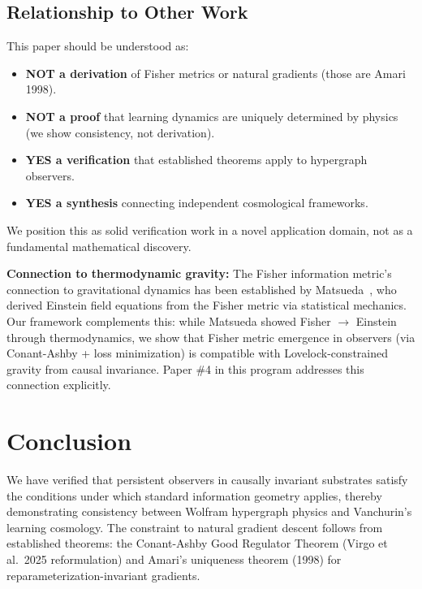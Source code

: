 \documentclass[11pt,a4paper]{article}
\theoremstyle{plain}
\theoremstyle{definition}
\theoremstyle{remark}
\begin{document}
\subsection{Relationship to Other Work}

This paper should be understood as:
\begin{itemize}[noitemsep]
\item \textbf{NOT a derivation} of Fisher metrics or natural gradients (those are Amari 1998).
\item \textbf{NOT a proof} that learning dynamics are uniquely determined by physics (we show consistency, not derivation).
\item \textbf{YES a verification} that established theorems apply to hypergraph observers.
\item \textbf{YES a synthesis} connecting independent cosmological frameworks.
\end{itemize}

We position this as solid verification work in a novel application domain, not as a fundamental mathematical discovery.

\textbf{Connection to thermodynamic gravity:} The Fisher information metric's connection to gravitational dynamics has been established by Matsueda~\cite{matsueda2013emergent}, who derived Einstein field equations from the Fisher metric via statistical mechanics. Our framework complements this: while Matsueda showed Fisher $\to$ Einstein through thermodynamics, we show that Fisher metric emergence in observers (via Conant-Ashby + loss minimization) is compatible with Lovelock-constrained gravity from causal invariance. Paper \#4 in this program addresses this connection explicitly.


\section{Conclusion}
\label{sec:conclusion}

We have verified that persistent observers in causally invariant substrates satisfy the conditions under which standard information geometry applies, thereby demonstrating consistency between Wolfram hypergraph physics and Vanchurin's learning cosmology. The constraint to natural gradient descent follows from established theorems: the Conant-Ashby Good Regulator Theorem (Virgo et al.~2025 reformulation) and Amari's uniqueness theorem (1998) for reparameterization-invariant gradients.
\end{document}
